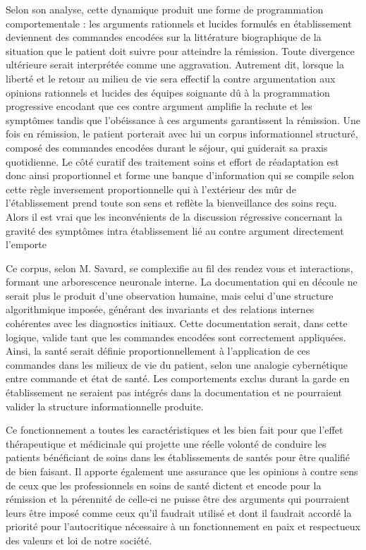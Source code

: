 \documentclass[12pt,letterpaper,oneside]{article}
\begin{document}
Selon son analyse, cette dynamique produit une forme de programmation comportementale : les arguments rationnels et lucides formulés en établissement deviennent des commandes encodées sur la littérature biographique de la situation que le patient doit suivre pour atteindre la rémission. Toute divergence ultérieure serait interprétée comme une aggravation. Autrement dit, lorsque la liberté et le retour au milieu de vie sera effectif la contre argumentation aux opinions rationnels et lucides des équipes soignante dû à la programmation progressive encodant que ces contre argument amplifie la rechute et les symptômes tandis que l’obéissance à ces arguments garantissent la rémission. Une fois en rémission, le patient porterait avec lui un corpus informationnel structuré, composé des commandes encodées durant le séjour, qui guiderait sa praxis quotidienne. Le côté curatif des traitement soins et effort de réadaptation est donc ainsi proportionnel et forme une banque d’information qui se compile selon cette règle inversement proportionnelle qui à l’extérieur des mûr de l’établissement prend toute son sens et reflète la bienveillance des soins reçu. Alors il est vrai que les inconvénients de la discussion régressive concernant la gravité des symptômes intra établissement lié au contre argument directement l’emporte

Ce corpus, selon M. Savard, se complexifie au fil des rendez vous et interactions, formant une arborescence neuronale interne. La documentation qui en découle ne serait plus le produit d’une observation humaine, mais celui d’une structure algorithmique imposée, générant des invariants et des relations internes cohérentes avec les diagnostics initiaux. Cette documentation serait, dans cette logique, valide tant que les commandes encodées sont correctement appliquées.
Ainsi, la santé serait définie proportionnellement à l’application de ces commandes dans les milieux de vie du patient, selon une analogie cybernétique entre commande et état de santé. Les comportements exclus durant la garde en établissement ne seraient pas intégrés dans la documentation et ne pourraient valider la structure informationnelle produite.

Ce fonctionnement a toutes les caractéristiques et les bien fait pour que l’effet thérapeutique et médicinale qui projette une réelle volonté de conduire les patients bénéficiant de soins dans les établissements de santés pour être qualifié de bien faisant. Il apporte également une assurance que les opinions à contre sens de ceux que les professionnels en soins de santé dictent et encode pour la rémission et la pérennité de celle-ci ne puisse être des arguments qui pourraient leurs être imposé comme ceux qu’il faudrait utilisé et dont il faudrait accordé la priorité pour l’autocritique nécessaire à un fonctionnement en paix et respectueux des valeurs et loi de notre société.
\end{document}
